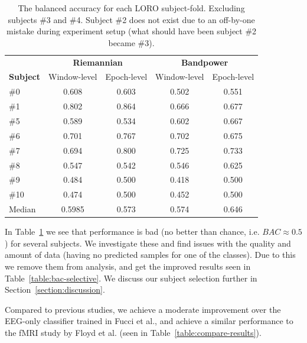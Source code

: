         \begin{table}[h]
            \centering
            \begin{tabular}{lcccc}
                \toprule
                & \multicolumn{2}{c}{\textbf{Riemannian}} & \multicolumn{2}{c}{\textbf{Bandpower}} \\
                \cmidrule(lr){2-3}
                \cmidrule(lr){4-5}
                \textbf{Subject} & Window-level & Epoch-level & Window-level & Epoch-level \\
                \midrule
                \#0  & 0.608 & 0.603 & 0.502 & 0.551 \\
                \#1  & 0.802 & 0.864 & 0.666 & 0.677 \\
                \#5  & 0.589 & 0.534 & 0.602 & 0.667 \\
                \#6  & 0.701 & 0.767 & 0.702 & 0.675 \\
                \#7  & 0.694 & 0.800 & 0.725 & 0.733 \\
                \#8  & 0.547 & 0.542 & 0.546 & 0.625 \\
                \#9  & 0.484 & 0.500 & 0.418 & 0.500 \\
                \#10 & 0.474 & 0.500 & 0.452 & 0.500 \\
                \midrule
                Median & 0.5985 & 0.573 & 0.574 & 0.646 \\
                \bottomrule
            \end{tabular}
            \caption{The balanced accuracy for each LORO subject-fold. Excluding subjects \#3 and \#4. Subject \#2 does not exist due to an off-by-one mistake during experiment setup (what should have been subject \#2 became \#3).}\label{table:bac-all}
        \end{table}

        In Table~\ref{table:bac-all} we see that performance is bad (no better than chance, i.e. $BAC \approx 0.5$) for several subjects. We investigate these and find issues with the quality and amount of data (having no predicted samples for one of the classes). Due to this we remove them from analysis, and get the improved results seen in Table~\ref{table:bac-selective}. We discuss our subject selection further in Section~\ref{section:discussion}.

        Compared to previous studies, we achieve a moderate improvement over the EEG-only classifier trained in Fucci et al., and achieve a similar performance to the fMRI study by Floyd et al. (seen in Table~\ref{table:compare-results}).

